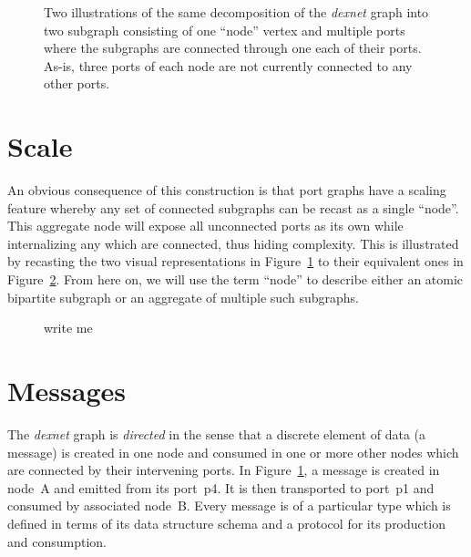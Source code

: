 \documentclass[letterpaper,oneside]{memoir}
\def\dexnet{\textit{dexnet}\xspace}
\begin{document}
\begin{figure}[htbp]
  \centering
  

  \caption{Two illustrations of the same decomposition of the \dexnet graph into two subgraph consisting of one ``node'' vertex and multiple ports where the subgraphs are connected through one each of their ports.  As-is, three ports of each node are not currently connected to any other ports.}
  \label{fig:bpsg}
\end{figure}



\section{Scale}

An obvious consequence of this construction is that port graphs have a scaling feature whereby any set of connected subgraphs can be recast as a single ``node''. 
This aggregate node will expose all unconnected ports as its own while internalizing any which are connected, thus hiding complexity. 
This is illustrated by recasting the two visual representations in Figure~\ref{fig:bpsg} to their equivalent ones in Figure~\ref{fig:bpsgrecast}.
From here on, we will use the term ``node'' to describe either an atomic bipartite subgraph or an aggregate of multiple such subgraphs.


\begin{figure}[htbp]
  \centering
  

  \caption{write me}
  \label{fig:bpsgrecast}
\end{figure}

\section{Messages}

The \dexnet graph is \textit{directed} in the sense that a discrete element of data (a message) is created in one node and consumed in one or more other nodes which are connected by their intervening ports. 
In Figure~\ref{fig:bpsg}, a message is created in node~\textsf{A} and emitted from its port~\textsf{p4}.  It is then transported to port~\textsf{p1} and consumed by associated node~\textsf{B}.
Every message is of a particular type which is defined in terms of its data structure schema and a protocol for its production and consumption. 
\end{document}
